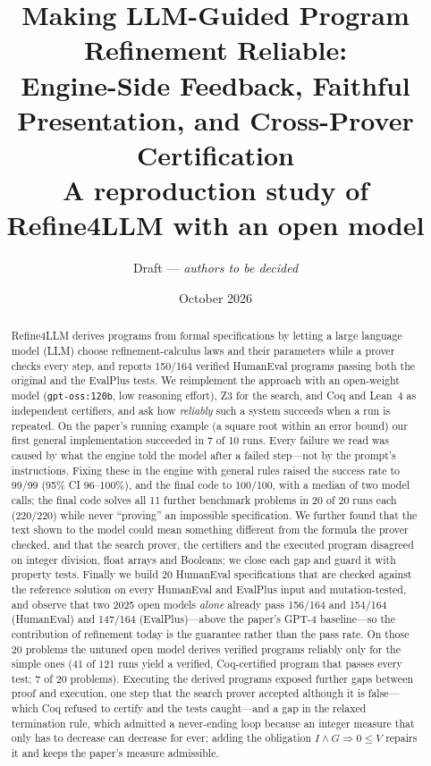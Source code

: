 \documentclass[10pt]{article}
\title{Making LLM-Guided Program Refinement Reliable:\\
Engine-Side Feedback, Faithful Presentation, and Cross-Prover Certification\\
\large A reproduction study of Refine4LLM with an open model}
\author{Draft --- \textit{authors to be decided}}
\date{October 2026}
\newcommand{\code}[1]{\texttt{#1}}
\begin{document}
\maketitle

\begin{abstract}
Refine4LLM derives programs from formal specifications by letting a large language model (LLM) choose refinement-calculus laws and their parameters while a prover checks every step, and reports 150/164 verified HumanEval programs passing both the original and the EvalPlus tests. We reimplement the approach with an open-weight model (\code{gpt-oss:120b}, low reasoning effort), Z3 for the search, and Coq and Lean~4 as independent certifiers, and ask how \emph{reliably} such a system succeeds when a run is repeated. On the paper's running example (a square root within an error bound) our first general implementation succeeded in 7 of 10 runs. Every failure we read was caused by what the engine told the model after a failed step---not by the prompt's instructions. Fixing these in the engine with general rules raised the success rate to 99/99 (95\% CI 96--100\%), and the final code to 100/100, with a median of two model calls; the final code solves all 11 further benchmark problems in 20 of 20 runs each (220/220) while never ``proving'' an impossible specification. We further found that the text shown to the model could mean something different from the formula the prover checked, and that the search prover, the certifiers and the executed program disagreed on integer division, float arrays and Booleans; we close each gap and guard it with property tests. Finally we build 20 HumanEval specifications that are checked against the reference solution on every HumanEval and EvalPlus input and mutation-tested, and observe that two 2025 open models \emph{alone} already pass 156/164 and 154/164 (HumanEval) and 147/164 (EvalPlus)---above the paper's GPT-4 baseline---so the contribution of refinement today is the guarantee rather than the pass rate. On those 20 problems the untuned open model derives verified programs reliably only for the simple ones (41 of 121 runs yield a verified, Coq-certified program that passes every test; 7 of 20 problems). Executing the derived programs exposed further gaps between proof and execution, one step that the search prover accepted although it is false---which Coq refused to certify and the tests caught---and a gap in the relaxed termination rule, which admitted a never-ending loop because an integer measure that only has to decrease can decrease for ever; adding the obligation $I\wedge G\Rightarrow 0\le V$ repairs it and keeps the paper's measure admissible.
\end{abstract}
\end{document}
